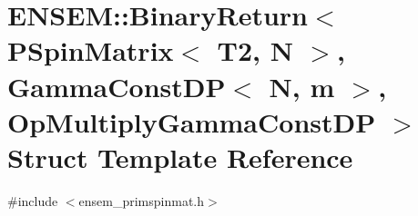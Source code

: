 \hypertarget{structENSEM_1_1BinaryReturn_3_01PSpinMatrix_3_01T2_00_01N_01_4_00_01GammaConstDP_3_01N_00_01m_01fc91b4deeb7eab4452a6a4224b8c6fde}{}\section{E\+N\+S\+EM\+:\+:Binary\+Return$<$ P\+Spin\+Matrix$<$ T2, N $>$, Gamma\+Const\+DP$<$ N, m $>$, Op\+Multiply\+Gamma\+Const\+DP $>$ Struct Template Reference}
\label{structENSEM_1_1BinaryReturn_3_01PSpinMatrix_3_01T2_00_01N_01_4_00_01GammaConstDP_3_01N_00_01m_01fc91b4deeb7eab4452a6a4224b8c6fde}


{\ttfamily \#include $<$ensem\+\_\+primspinmat.\+h$>$}

